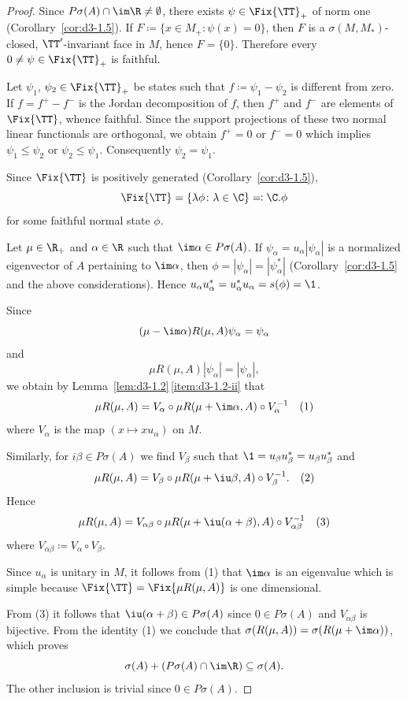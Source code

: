 \begin{proof}
Since $P\sigma(A) \cap \im\R \neq \emptyset$, there exists $\psi \in \Fix{\TT}_{+}$ of norm one (Corollary~\ref{cor:d3-1.5}).
If\/ $F \coloneqq \{x \in M_{+} \colon \psi(x) = 0\}$, then $F$ is a $\sigma(M,M_{*})$-closed, $\TT'$-invariant face in $M$, hence $F = \{0\}$.
Therefore every $0 \neq \psi \in \Fix{\TT}_{+}$ is faithful.

Let $\psi_{1}$, $\psi_{2} \in \Fix{\TT}_{+}$ be states such that $f \coloneqq \psi_{1} - \psi_{2}$ is different from zero. 
If\/ $f = f^{+} - f^{-}$ is the Jordan decomposition of\/ $f$, then $f^{+}$ and $f^{-}$ are elements of\/ $\Fix{\TT}$, whence faithful.
Since the support projections of these two normal linear functionals are orthogonal, we obtain $f^{+} = 0$ or $f^{-} = 0$ which implies $\psi_{1} \leq \psi_{2}$ or $\psi_{2} \leq \psi_{1}$.
Consequently $\psi_{2} = \psi_{1}$.

Since $\Fix{\TT}$ is positively generated (Corollary~\ref{cor:d3-1.5}), 
\[
\Fix{\TT} = \{ \lambda \phi \colon \lambda \in \C \} \eqcolon \C.\phi
\]
for some faithful normal state $\phi$.

Let $\mu \in \R_{+}$ and $\alpha \in \R$ such that $\im\alpha \in P\sigma(A)$.
If\/ $\psi_{\alpha} = u_{\alpha}|\psi_{\alpha}|$ is a normalized eigenvector of\/ $A$ pertaining to $\im\alpha$, then $\phi = |\psi_{\alpha}| = |\psi_{\alpha}^{*}|$ (Corollary~\ref{cor:d3-1.5} and the above considerations).
Hence $u_{\alpha}u_{\alpha}^{*} = u_{\alpha}^{*}u_{\alpha} = s(\phi) = \1$.

Since
\[
(\mu - \im\alpha)R(\mu,A)\psi_{\alpha} = \psi_{\alpha}
\]
and
\[
\mu R(\mu,A)|\psi_{\alpha}| = |\psi_{\alpha}| ,
\]
we obtain by Lemma~\ref{lem:d3-1.2}\,\ref{item:d3-1.2-ii} that
\[
\mu R(\mu,A) = V_{\alpha} \circ \mu R(\mu+\im\alpha,A) \circ V_{\alpha}^{-1} \quad (1)
\]
where $V_{\alpha}$ is the map $(x \mapsto xu_{\alpha})$ on $M$.

Similarly, for $i\beta \in P\sigma(A)$ we find $V_{\beta}$ such that $\1 = u_{\beta}u_{\beta}^{*} = u_{\beta}u_{\beta}^{*}$ and
\[
\mu R(\mu,A) = V_{\beta} \circ \mu R(\mu+ \iu \beta,A) \circ V_{\beta}^{-1}. \quad (2) 
\]
Hence
\[
\mu R(\mu,A) = V_{\alpha\beta} \circ \mu R(\mu+ \iu (\alpha+\beta),A) \circ V_{\alpha\beta}^{-1} \quad (3)
\]
where $V_{\alpha\beta} \coloneqq V_{\alpha} \circ V_{\beta}$.

Since $u_{\alpha}$ is unitary in $M$, it follows from (1) that $\im\alpha$ is an eigenvalue which is simple because $\Fix{\TT} = \Fix{\mu R(\mu,A)}$ is one dimensional.

From (3) it follows that $\iu(\alpha+\beta) \in P\sigma(A)$ since $0 \in P\sigma(A)$ and $V_{\alpha\beta}$ is bijective.
From the identity (1) we conclude that $\sigma(R(\mu,A)) = \sigma(R(\mu+\im\alpha))$, which proves
\[
\sigma(A) + (P\sigma(A) \cap \im\R) \subseteq \sigma(A).
\]
The other inclusion is trivial since $0 \in P\sigma(A)$.
\end{proof}
